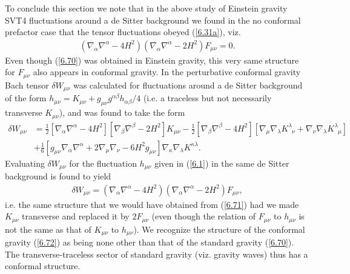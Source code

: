 \documentclass[aps,onecolumn,10pt]{revtex4}
\numberwithin{equation}{section}
\numberwithin{equation}{section}
\begin{document}
To conclude this section we note that in the above study of Einstein gravity SVT4 fluctuations around a de Sitter background we found in the no conformal prefactor case that the tensor fluctuations obeyed (\ref{6.31a}), viz.  
%
\begin{eqnarray}
(\nabla_{\alpha}\nabla^{\alpha}-4H^2)(\nabla_{\alpha}\nabla^{\alpha}-2H^2)F_{\mu\nu}=0.
\label{6.70}
\end{eqnarray}
%
Even though (\ref{6.70}) was obtained in Einstein gravity, this very same structure for $F_{\mu\nu}$ also appears in conformal gravity. In \cite{Mannheim2012a}  the perturbative conformal gravity Bach tensor $\delta W_{\mu\nu}$ was calculated for fluctuations around a de Sitter background of the form $h_{\mu\nu}=K_{\mu\nu}+g_{\mu\nu}g^{\alpha\beta}h_{\alpha\beta}/4$ (i.e. a traceless but not necessarily transverse $K_{\mu\nu}$), and was found to take the  form
%
\begin{align}
\delta W_{\mu\nu}&=\frac{1}{2}[\nabla_{\alpha}\nabla^{\alpha}-4H^2][\nabla_{\beta}\nabla^{\beta}-2H^2]K_{\mu\nu}
-\frac{1}{2}[\nabla_{\beta}\nabla^{\beta}-4H^2][
\nabla_{\mu}\nabla_{\lambda}K^{\lambda}_{\phantom{\lambda}\nu}
+\nabla_{\nu}\nabla_{\lambda}K^{\lambda}_{\phantom{\lambda}\mu}]
\nonumber\\
&+\frac{1}{6}[g_{\mu\nu}\nabla_{\alpha}\nabla^{\alpha}+2\nabla_{\mu}\nabla_{\nu}
-6H^2g_{\mu\nu}]\nabla_{\kappa}\nabla_{\lambda}K^{\kappa\lambda}.
\label{6.71}
\end{align}
%
Evaluating $\delta W_{\mu\nu}$ for the fluctuation $h_{\mu\nu}$ given in (\ref{6.1}) in the same de Sitter background is found to yield 
\begin{eqnarray}
\delta W_{\mu\nu}= (\nabla_{\alpha}\nabla^{\alpha}-4H^2)(\nabla_{\alpha}\nabla^{\alpha}-2H^2)F_{\mu\nu},
\label{6.72}
\end{eqnarray}
%
i.e. the same structure that we would have obtained from (\ref{6.71}) had we made $K_{\mu\nu}$ transverse and replaced it by $2F_{\mu\nu}$ (even though the relation of $F_{\mu\nu}$ to  $h_{\mu\nu}$ is not the same as that of $K_{\mu\nu}$ to $h_{\mu\nu}$). We recognize the structure of the conformal gravity (\ref{6.72}) as being none other than that of the standard gravity (\ref{6.70}). The transverse-traceless sector of standard gravity (viz. gravity waves) thus has a conformal structure.
\end{document}
